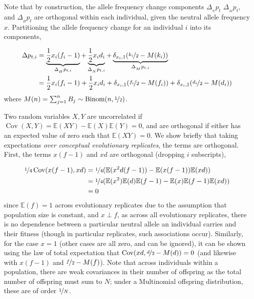 \documentclass[11pt]{article}
\newcommand{\E}{\mathbb{E}}
\DeclareMathOperator{\cov}{Cov}
\begin{document}
Note that by construction, the allele frequency change components $\Delta_{_N}
p_t$ $\Delta_{_M} p_t$, and $\Delta_{_H} p_t$ are orthogonal within each
individual, given the neutral allele frequency $x$. Partitioning the allele
frequency change for an individual $i$ into its components,

\begin{align}
  \Delta p_{t,i} &= \underbrace{\frac{1}{2} x_i (f_i - 1)}_{\Delta_{_H} p_{t,i}} + 
       \underbrace{\frac{1}{2} x_i d_i}_{\Delta_{_N} p_{t,i}} + 
       \underbrace{\delta_{x_i,1}(\nicefrac{k_i}{2} - M(k_i))}_{\Delta_{_M} p_{t,i}} \\
       &= \frac{1}{2} x_i (f_i - 1) + 
       \frac{1}{2} x_i d_i + 
       \delta_{x_i,1}(\nicefrac{f_i}{2} - M(f_i)) + 
       \delta_{x_i,1}(\nicefrac{d_i}{2} - M(d_i))
\end{align}
%
where $M(n) = \sum_{j=1}^{n} B_j \sim \text{Binom}(n, \nicefrac{1}{2})$.

Two random variables $X, Y$ are uncorrelated if $\cov(X, Y) = \E(XY)
- \E(X)\E(Y)= 0$, and are orthogonal if either has an expected value of zero
such that $\E(XY) = 0$. We show briefly that taking expectations \emph{over
conceptual evolutionary replicates}, the terms are orthogonal. First, the terms
$x(f-1)$ and $x d$ are orthogonal (dropping $i$ subscripts),

\begin{align}
  \nicefrac{1}{4} \cov(x(f-1), x d) &= \nicefrac{1}{4}(\E(x^2 d (f-1)) - \E(x(f-1)) \E(x d)) \nonumber \\
                                    &= \nicefrac{1}{4} (\E(x^2) \E(d) \E(f-1) - \E(x)\E(f-1) \E(x d)) \nonumber \\
                                    &= 0
\end{align}
%
since $\E(f) = 1$ across evolutionary replicates due to the assumption that
population size is constant, and $x \perp f$, as across all evolutionary
replicates, there is no dependence between a particular neutral allele an
individual carries and their fitness (though in particular replicates, such
associations occur). Similarly, for the case $x=1$ (other cases are all zero,
and can be ignored), it can be shown using the law of total expectation that
$\cov(x d, \nicefrac{d}{2} - M(d)) = 0$ (and likewise with $x (f-1)$ and
$\nicefrac{f}{2} - M(f)$). Note that across individuals within a population,
there are weak covariances in their number of offspring as the total number of
offspring must sum to $N$; under a Multinomial offspring distribution, these
are of order $\nicefrac{1}{N}$.
\end{document}
